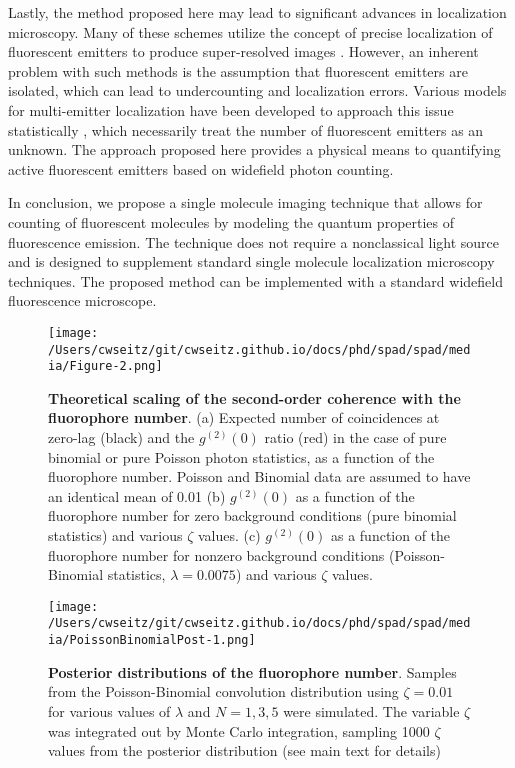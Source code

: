 Lastly, the method proposed here may lead to significant advances in localization microscopy. Many of these schemes utilize the concept of precise localization of fluorescent emitters to produce super-resolved images \parencite{Rust2006,Betzig2006}. However, an inherent problem with such methods is the assumption that fluorescent emitters are isolated, which can lead to undercounting and localization errors. Various models for multi-emitter localization have been developed to approach this issue statistically \parencite{Nehme2020,Speiser2021,Li2019,Fazel2019}, which necessarily treat the number of fluorescent emitters as an unknown. The approach proposed here provides a physical means to quantifying active fluorescent emitters based on widefield photon counting.

In conclusion, we propose a single molecule imaging technique that allows for counting of fluorescent molecules by modeling the quantum properties of fluorescence emission. The technique does not require a nonclassical light source and is designed to supplement standard single molecule localization microscopy techniques. The proposed method can be implemented with a standard widefield fluorescence microscope.

\clearpage
\begin{figure}
\centering
\texttt{[image: /Users/cwseitz/git/cwseitz.github.io/docs/phd/spad/spad/media/Figure-2.png]}
\caption{\textbf{Theoretical scaling of the second-order coherence with the fluorophore number}. (a) Expected number of coincidences at zero-lag (black) and the $g^{(2)}(0)$ ratio (red) in the case of pure binomial or pure Poisson photon statistics, as a function of the fluorophore number. Poisson and Binomial data are assumed to have an identical mean of 0.01 (b) $g^{(2)}(0)$ as a function of the fluorophore number for zero background conditions (pure binomial statistics) and various $\zeta$ values. (c) $g^{(2)}(0)$ as a function of the fluorophore number for nonzero background conditions (Poisson-Binomial statistics, $\lambda=0.0075$) and various $\zeta$ values.}
\label{fig:binomvpoiss}
\end{figure}  


\begin{figure*}
\centering
\texttt{[image: /Users/cwseitz/git/cwseitz.github.io/docs/phd/spad/spad/media/PoissonBinomialPost-1.png]}
\caption{\textbf{Posterior distributions of the fluorophore number}. Samples from the Poisson-Binomial convolution distribution using $\zeta=0.01$ for various values of $\lambda$ and $N=1,3,5$ were simulated. The variable $\zeta$ was integrated out by Monte Carlo integration, sampling 1000 $\zeta$ values from the posterior distribution (see main text for details)}
\label{fig:fig9}
\end{figure*}    

